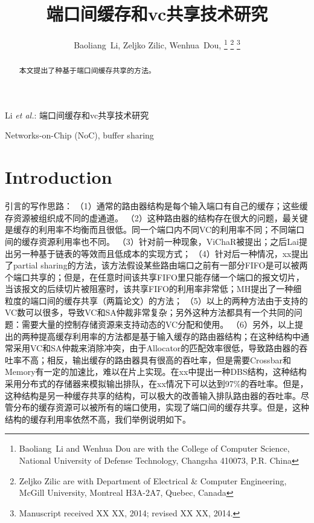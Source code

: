﻿\documentclass[10pt,journal]{IEEEtran}
\begin{document}
\title{端口间缓存和vc共享技术研究}

\author{Baoliang~Li, %
        Zeljko Zilic, %
        Wenhua~Dou, %
\thanks{Baoliang~Li and Wenhua Dou are with the College of Computer Science, National University of Defense Technology, Changsha 410073, P.R. China}%
\thanks{Zeljko Zilic are with Department of Electrical \& Computer Engineering, McGill University, Montreal H3A-2A7, Quebec, Canada}%
\thanks{Manuscript received XX XX, 2014; revised XX XX, 2014.}}

%
{Li \MakeLowercase{\textit{et al.}}: 端口间缓存和vc共享技术研究}

\maketitle

\begin{abstract}
本文提出了种基于端口间缓存共享的方法。
\end{abstract}
\begin{IEEEkeywords}
Networks-on-Chip (NoC), buffer sharing
\end{IEEEkeywords}

\section{Introduction}
引言的写作思路：
（1）通常的路由器结构是每个输入端口有自己的缓存；这些缓存资源被组织成不同的虚通道。
（2）这种路由器的结构存在很大的问题，最关键是缓存的利用率不均衡而且很低。同一个端口内不同VC的利用率不同；不同端口间的缓存资源利用率也不同。
（3）针对前一种现象，ViChaR被提出；之后Lai提出另一种基于链表的等效而且低成本的实现方式；
（4）针对后一种情况，xx提出了partial sharing的方法，该方法假设某些路由端口之前有一部分FIFO是可以被两个端口共享的；但是，在任意时间该共享FIFO里只能存储一个端口的报文切片，当该报文的后续切片被阻塞时，该共享FIFO的利用率非常低；MH提出了一种细粒度的端口间的缓存共享（两篇论文）的方法；
（5）以上的两种方法由于支持的VC数可以很多，导致VC和SA仲裁非常复杂；另外这种方法都具有一个共同的问题：需要大量的控制存储资源来支持动态的VC分配和使用。
（6）另外，以上提出的两种提高缓存利用率的方法都是基于输入缓存的路由器结构；在这种结构中通常采用VC和SA仲裁来消除冲突，由于Allocator的匹配效率很低，导致路由器的吞吐率不高；相反，输出缓存的路由器具有很高的吞吐率，但是需要Crossbar和Memory有一定的加速比，难以在片上实现。在xx中提出一种DBS结构，这种结构采用分布式的存储器来模拟输出排队，在xx情况下可以达到97\%的吞吐率。但是，这种结构是另一种缓存共享的结构，可以极大的改善输入排队路由器的吞吐率。尽管分布的缓存资源可以被所有的端口使用，实现了端口间的缓存共享。但是，这种结构的缓存利用率依然不高，我们举例说明如下。
\end{document}
